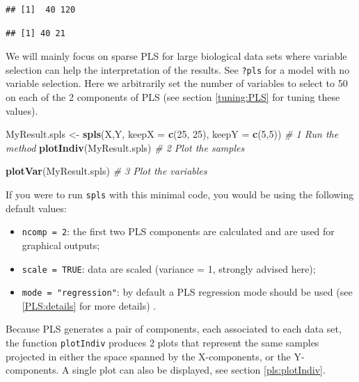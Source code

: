 \documentclass[]{book}
\newenvironment{Shaded}{\begin{snugshade}}{\end{snugshade}}
\newcommand{\KeywordTok}[1]{\textcolor[rgb]{0.13,0.29,0.53}{\textbf{#1}}}
\newcommand{\DataTypeTok}[1]{\textcolor[rgb]{0.13,0.29,0.53}{#1}}
\newcommand{\DecValTok}[1]{\textcolor[rgb]{0.00,0.00,0.81}{#1}}
\newcommand{\StringTok}[1]{\textcolor[rgb]{0.31,0.60,0.02}{#1}}
\newcommand{\CommentTok}[1]{\textcolor[rgb]{0.56,0.35,0.01}{\textit{#1}}}
\newcommand{\NormalTok}[1]{#1}
\providecommand{\tightlist}{%
  \setlength{\itemsep}{0pt}\setlength{\parskip}{0pt}}
\theoremstyle{definition}
\theoremstyle{definition}
\theoremstyle{definition}
\theoremstyle{remark}
\begin{document}
\begin{verbatim}
## [1]  40 120
\end{verbatim}

\begin{verbatim}
## [1] 40 21
\end{verbatim}

We will mainly focus on sparse PLS for large biological data sets where
variable selection can help the interpretation of the results. See
\texttt{?pls} for a model with no variable selection. Here we
arbitrarily set the number of variables to select to 50 on each of the 2
components of PLS (see section \ref{tuning:PLS} for tuning these
values).

\begin{Shaded}
\begin{Highlighting}[]
\NormalTok{MyResult.spls <-}\StringTok{ }\KeywordTok{spls}\NormalTok{(X,Y, }\DataTypeTok{keepX =} \KeywordTok{c}\NormalTok{(}\DecValTok{25}\NormalTok{, }\DecValTok{25}\NormalTok{), }\DataTypeTok{keepY =} \KeywordTok{c}\NormalTok{(}\DecValTok{5}\NormalTok{,}\DecValTok{5}\NormalTok{))  }\CommentTok{# 1 Run the method}
\KeywordTok{plotIndiv}\NormalTok{(MyResult.spls)                                       }\CommentTok{# 2 Plot the samples}
\end{Highlighting}
\end{Shaded}

\begin{Shaded}
\begin{Highlighting}[]
\KeywordTok{plotVar}\NormalTok{(MyResult.spls)                                         }\CommentTok{# 3 Plot the  variables}
\end{Highlighting}
\end{Shaded}

If you were to run \texttt{spls} with this minimal code, you would be
using the following default values:

\begin{itemize}
\tightlist
\item
  \texttt{ncomp\ =\ 2}: the first two PLS components are calculated and
  are used for graphical outputs;
\item
  \texttt{scale\ =\ TRUE}: data are scaled (variance = 1, strongly
  advised here);
\item
  \texttt{mode\ =\ "regression"}: by default a PLS regression mode
  should be used (see \ref{PLS:details} for more details) .
\end{itemize}

Because PLS generates a pair of components, each associated to each data
set, the function \texttt{plotIndiv} produces 2 plots that represent the
same samples projected in either the space spanned by the X-components,
or the Y-components. A single plot can also be displayed, see section
\ref{pls:plotIndiv}.
\end{document}
